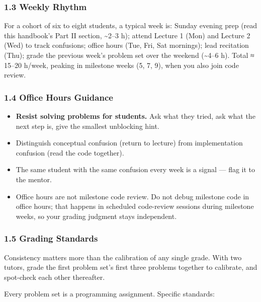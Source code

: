 \documentclass[
]{article}
\providecommand{\tightlist}{%
  \setlength{\itemsep}{0pt}\setlength{\parskip}{0pt}}
\begin{document}
\subsubsection{1.3 Weekly Rhythm}\label{weekly-rhythm}

For a cohort of six to eight students, a typical week is: Sunday evening
prep (read this handbook's Part II section, \textasciitilde2--3 h);
attend Lecture 1 (Mon) and Lecture 2 (Wed) to track confusions; office
hours (Tue, Fri, Sat mornings); lead recitation (Thu); grade the
previous week's problem set over the weekend (\textasciitilde4--6 h).
Total ≈ 15--20 h/week, peaking in milestone weeks (5, 7, 9), when you
also join code review.

\subsubsection{1.4 Office Hours Guidance}\label{office-hours-guidance}

\begin{itemize}
\tightlist
\item
  \textbf{Resist solving problems for students.} Ask what they tried,
  ask what the next step is, give the smallest unblocking hint.
\item
  Distinguish conceptual confusion (return to lecture) from
  implementation confusion (read the code together).
\item
  The same student with the same confusion every week is a signal ---
  flag it to the mentor.
\item
  Office hours are not milestone code review. Do not debug milestone
  code in office hours; that happens in scheduled code-review sessions
  during milestone weeks, so your grading judgment stays independent.
\end{itemize}

\subsubsection{1.5 Grading Standards}\label{grading-standards}

Consistency matters more than the calibration of any single grade. With
two tutors, grade the first problem set's first three problems together
to calibrate, and spot-check each other thereafter.

Every problem set is a programming assignment. Specific standards:
\end{document}
